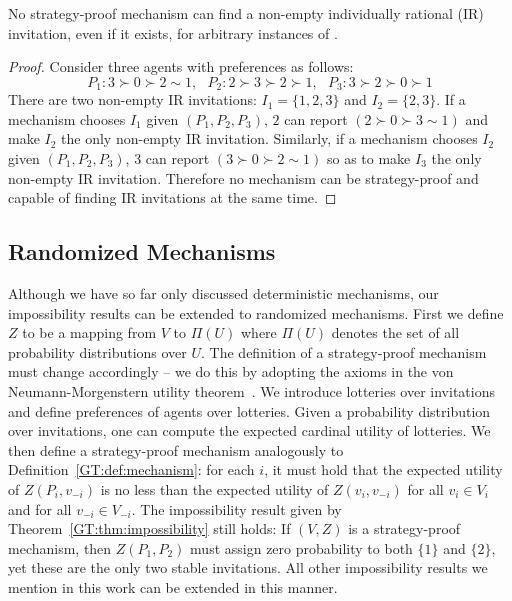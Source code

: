 \begin{theorem} \label{GT:thm:impossibility_IR}
	No strategy-proof mechanism can find a non-empty individually rational (IR) invitation, even if it exists, for arbitrary instances of \AOIP.
\end{theorem}
\begin{proof}
Consider three agents with preferences as follows:
\begin{equation*}
			P_1: 3\succ 0 \succ 2 \sim 1,~~~ P_2: 2 \succ 3 \succ 2 \succ 1,~~~ P_3: 3 \succ 2 \succ 0 \succ 1
\end{equation*}
There are two non-empty IR invitations: $I_1 = \{1, 2, 3\}$ and $I_2 = \{2, 3\}$. 
If a mechanism chooses $I_1$ given $(P_1, P_2, P_3)$, $2$ can report $(2 \succ 0 \succ 3 \sim 1)$ and make $I_2$ the only non-empty IR invitation. Similarly, if a mechanism chooses $I_2$ given $(P_1, P_2, P_3)$, $3$ can report $(3 \succ 0 \succ 2 \sim 1)$ so as to make $I_3$ the only non-empty IR invitation. Therefore no mechanism can be strategy-proof and capable of finding IR invitations at the same time.
\end{proof}



\subsection{Randomized Mechanisms} \label{GT:sec:randomized}
Although we have so far only discussed deterministic mechanisms, our impossibility results can be extended to randomized mechanisms. First we define $Z$ to be a mapping from $V$ to $\Pi(U)$ where $\Pi(U)$ denotes the set of all probability distributions over $U$. The definition of a strategy-proof mechanism must change accordingly -- we do this by adopting the axioms in the von Neumann-Morgenstern utility theorem~\cite{von1947theory}. We introduce lotteries over invitations and define preferences of agents over lotteries. Given a probability distribution over invitations, one can compute the expected cardinal utility of lotteries. We then define a strategy-proof mechanism analogously to Definition~\ref{GT:def:mechanism}: for each $i$, it must hold that the expected utility of $Z(P_i, v_{-i})$ is no less than the expected utility of $Z(v_i, v_{-i})$ for all $v_i\in V_i$ and for all $v_{-i} \in V_{-i}$. The impossibility result given by Theorem~\ref{GT:thm:impossibility} still holds: If $(V, Z)$ is a strategy-proof mechanism, then $Z(P_1, P_2)$ must assign zero probability to both $\{1\}$ and $\{2\}$, yet these are the only two stable invitations.  All other impossibility results we mention in this work can be extended in this manner.



